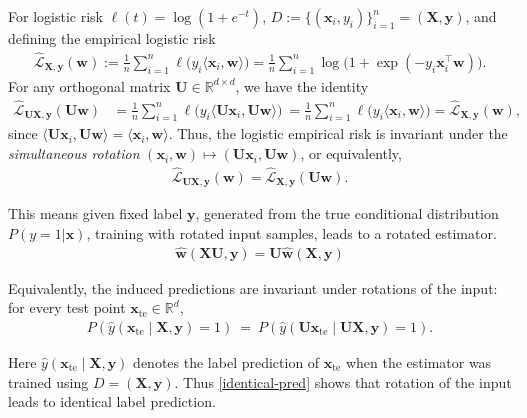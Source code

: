 \documentclass{article}
\theoremstyle{plain}
\theoremstyle{definition}
\theoremstyle{remark}
\begin{document}
{For logistic risk $\ell(t)=\log(1+e^{-t})$, $D := \{(\mathbf{x}_i, y_i)\}_{i=1}^n = (\mathbf{X}, \mathbf{y})$,
 and defining the empirical logistic risk
\begin{align}
\hat{\mathcal L}_{\boldsymbol X,\boldsymbol y}(\boldsymbol w)
:=\frac1n\sum_{i=1}^n \ell\!\big(y_i\langle \boldsymbol x_i,\boldsymbol w\rangle\big)
=\frac1n\sum_{i=1}^n \log\!\big(1+\exp(-y_i \boldsymbol x_i^\top \boldsymbol w)\big).
\end{align}
For any orthogonal matrix $\boldsymbol U\in\mathbb R^{d\times d}$, we have the identity
\begin{align}
\hat{\mathcal L}_{\boldsymbol U\boldsymbol X,\boldsymbol y}(\boldsymbol U\boldsymbol w)
&=\frac1n\sum_{i=1}^n \ell\!\big(y_i\langle \boldsymbol U\boldsymbol x_i,\boldsymbol U\boldsymbol w\rangle\big) \
=\frac1n\sum_{i=1}^n \ell\!\big(y_i\langle \boldsymbol x_i,\boldsymbol w\rangle\big)
=\hat{\mathcal L}_{\boldsymbol X,\boldsymbol y}(\boldsymbol w),
\end{align}
since $\langle \boldsymbol U\boldsymbol x_i,\boldsymbol U\boldsymbol w\rangle=\langle \boldsymbol x_i,\boldsymbol w\rangle$.
Thus, the logistic empirical risk is invariant under the
\emph{simultaneous rotation} $(\boldsymbol x_i,\boldsymbol w)\mapsto (\boldsymbol U\boldsymbol x_i,\boldsymbol U\boldsymbol w)$,
or equivalently,
\begin{align}
\hat{\mathcal L}_{\boldsymbol U\boldsymbol X,\boldsymbol y}(\boldsymbol w)
=\hat{\mathcal L}_{\boldsymbol X,\boldsymbol y}(\boldsymbol U \boldsymbol w).
\end{align}

This means given fixed label $\mathbf{y}$, generated from the true conditional distribution $P(y=1|\mathbf{x})$, training with rotated input samples, leads to a rotated estimator. 
\begin{align}
    \hat{\mathbf{w}}(\mathbf{X}\mathbf{U}, \mathbf{y}) = \mathbf{U} \hat{\mathbf{w}}(\mathbf{X},\mathbf{y})
\end{align}

Equivalently, the induced predictions are invariant under rotations of the input:
for every test point $\boldsymbol x_{\mathrm{te}}\in\mathbb R^d$,
\begin{align}
\label{identical-pred}
P(\hat y(\boldsymbol x_{\mathrm{te}}\mid \boldsymbol X,\boldsymbol y) =1)
~=~ P(\hat y(\boldsymbol U\boldsymbol x_{\mathrm{te}}\mid \boldsymbol U\boldsymbol X,\boldsymbol y)=1).
\end{align}

Here $\hat y(\boldsymbol x_{\mathrm{te}}\mid \boldsymbol X,\boldsymbol y)$ denotes the label prediction of $\mathbf{x}_{\mathrm{te}}$ when the estimator was trained using $D= (\mathbf{X}, \mathbf{y})$. Thus \eqref{identical-pred} shows that rotation of the input leads to identical label prediction. 

}
\end{document}
